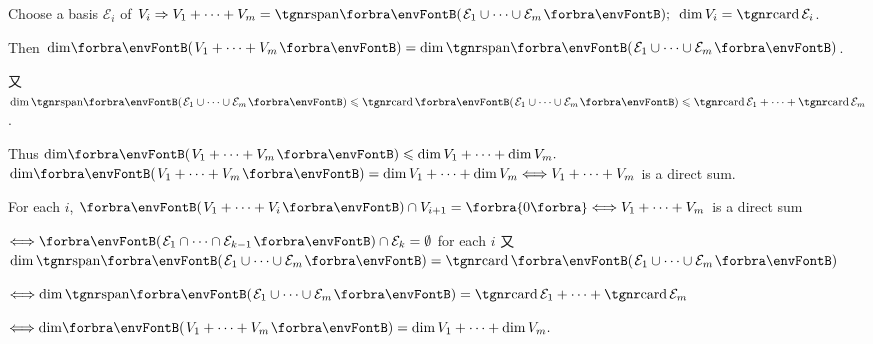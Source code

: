\documentclass[a4paper, 11pt, UTF8]{article}
\begin{document}
\begin{large}
\par\quad
Choose a basis $ \mathcal{E}_i$ of $V_i\Rightarrow V_1+\dots+V_m=\Span{\mathcal{E}_1\cup\cdots\cup \mathcal{E}_m};\,\,\,\dim V_i=\card \mathcal{E}_i$.\par\quad
Then $\dim\!\Par{V_1+\dots+V_m}=\dim\Span{\mathcal{E}_1\cup\cdots\cup \mathcal{E}_m}$.\par\quad
又 $\dim\Span{\mathcal{E}_1\cup\cdots\cup\mathcal{E}_m}\leqslant\card\Par{\mathcal{E}_1\cup\cdots\cup \mathcal{E}_m}\leqslant\card \mathcal{E}_1+\cdots+\card \mathcal{E}_m$.\par\quad
Thus $\dim\!\Par{V_1+\dots+V_m}\leqslant \dim V_1+\dots+\dim V_m.$\PfEnd\vspace{10pt}
\Comment \,\,\,{\tgsl\Large$\dim\!\Par{V_1+\dots+V_m}=\dim V_1+\dots+\dim V_m\Longleftrightarrow V_1+\dots+V_m$ is a direct sum.}\par
\Blind{\Comment\,\,\,}For each $i$, $\Par{V_1+\dots+V_i}\cap V_{i+1}=\zeroSubs\Longleftrightarrow V_1+\dots+V_m$ is a direct sum\par
\Blind{\Comment\,\,\,}$\Longleftrightarrow\Par{\mathcal{E}_1\cap\dots\cap\mathcal{E}_{k-1}}\cap\mathcal{E}_k=\emptyset$ for each $i$ 又 $\dim\Span{\mathcal{E}_1\cup\dots\cup\mathcal{E}_m}=\card\Par{\mathcal{E}_1\cup\dots\cup\mathcal{E}_m}$\par
\Blind{\Comment\,\,\,}$\Longleftrightarrow\dim\Span{\mathcal{E}_1\cup\dots\cup\mathcal{E}_m}=\card\mathcal{E}_1+\dots+\card\mathcal{E}_m$\par
\Blind{\Comment\,\,\,}$\Longleftrightarrow\dim\!\Par{V_1+\dots+V_m}=\dim V_1+\dots+\dim V_m.$\PfEnd
\SepLine


\end{large}
\end{document}

